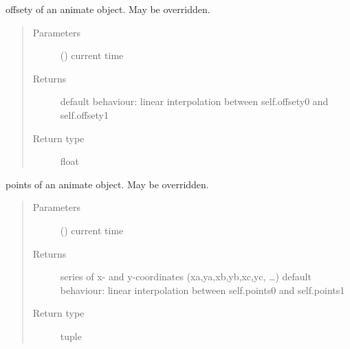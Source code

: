 \documentclass[letterpaper,10pt,english]{sphinxmanual}
\begin{document}
\begin{fulllineitems}
\begin{fulllineitems}
\begin{quote}
\begin{description}
\end{description}\end{quote}

\end{fulllineitems}


\begin{fulllineitems}
\label{\detokenize{Reference:salabim.Animate.offsety}}
offsety of an animate object. May be overridden.
\begin{quote}\begin{description}
\item[{Parameters}] \leavevmode
{} () \textendash{} current time

\item[{Returns}] \leavevmode
{} \textendash{} default behaviour: linear interpolation between self.offsety0 and self.offsety1

\item[{Return type}] \leavevmode
float

\end{description}\end{quote}

\end{fulllineitems}


\begin{fulllineitems}
\label{\detokenize{Reference:salabim.Animate.points}}
points of an animate object. May be overridden.
\begin{quote}\begin{description}
\item[{Parameters}] \leavevmode
{} () \textendash{} current time

\item[{Returns}] \leavevmode
{} \textendash{} series of x- and y-coordinates (xa,ya,xb,yb,xc,yc, …) 
default behaviour: linear interpolation between self.points0 and self.points1

\item[{Return type}] \leavevmode
tuple

\end{description}\end{quote}


\end{fulllineitems}
\end{fulllineitems}
\end{document}
